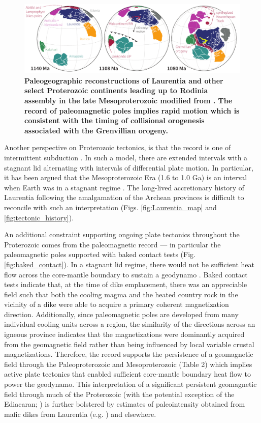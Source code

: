 \documentclass[11pt,letterpaper]{article}
\begin{document}
\begin{figure}
\centering
\includegraphics[width=\textwidth]{../Figures/Grenville_Reconstruction.pdf}
\caption{\small{\textbf{Paleogeographic reconstructions of Laurentia and other select Proterozoic continents leading up to Rodinia assembly in the late Mesoproterozoic modified from \cite{Swanson-Hysell2019a}. The record of paleomagnetic poles implies rapid motion which is consistent with the timing of collisional orogenesis associated with the Grenvillian orogeny.}}}
\label{fig:Grenville_reconstructions}
\end{figure}

Another perspective on Proterozoic tectonics, is that the record is one of intermittent subduction \citep{Silver2008a, ONeill2013a}. In such a model, there are extended intervals with a stagnant lid alternating with intervals of differential plate motion. In particular, it has been argued that the Mesoproterozoic Era (1.6 to 1.0 Ga) is an interval when Earth was in a stagnant regime \citep{Silver2008a, ONeill2013a}. The long-lived accretionary history of Laurentia following the amalgamation of the Archean provinces is difficult to reconcile with such an interpretation (Figs. \ref{fig:Laurentia_map} and \ref{fig:tectonic_history}). 

An additional constraint supporting ongoing plate tectonics throughout the Proterozoic comes from the paleomagnetic record --- in particular the paleomagnetic poles supported with baked contact tests (Fig. \ref{fig:baked_contact}). In a stagnant lid regime, there would not be sufficient heat flow across the core-mantle boundary to sustain a geodynamo \citep{Nimmo2000a, Buffett2000b}. Baked contact tests indicate that, at the time of dike emplacement, there was an appreciable field such that both the cooling magma and the heated country rock in the vicinity of a dike were able to acquire a primary coherent magnetization direction. Additionally, since paleomagnetic poles are developed from many individual cooling units across a region, the similarity of the directions across an igneous province indicates that the magnetizations were dominantly acquired from the geomagnetic field rather than being influenced by local variable crustal magnetizations.  Therefore, the record supports the persistence of a geomagnetic field through the Paleoproterozoic and Mesoproterozoic (Table 2) which implies active plate tectonics that enabled sufficient core-mantle boundary heat flow to power the geodynamo.  This interpretation of a significant persistent geomagnetic field through much of the Proterozoic (with the potential exception of the Ediacaran; \citealp{Bono2019a}) is further bolstered by estimates of paleointensity obtained from mafic dikes from Laurentia (e.g. \citealp{Macouin2006a}) and elsewhere. 
\end{document}
